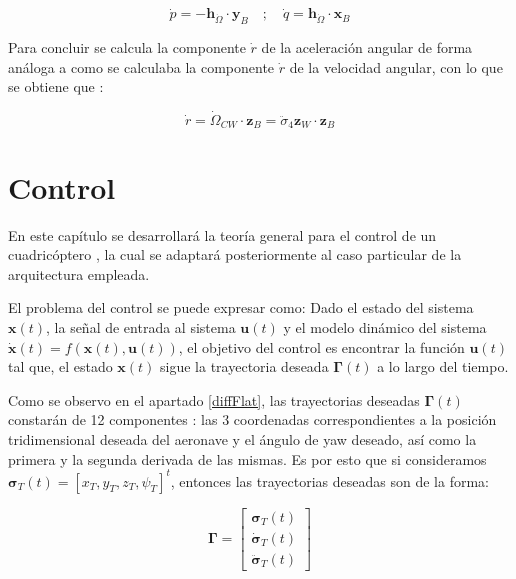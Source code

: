 \begin{equation}
	\dot p = -\textbf{h}_{\dot \Omega} \cdot \mathbf{y}_B \quad;\quad \dot q = \textbf{h}_{\dot \Omega}  \cdot \mathbf{x}_B
\end{equation}

Para concluir se calcula la componente $\dot{r}$ de la aceleración angular de forma análoga a como se calculaba la componente $\dot{r}$ de la velocidad angular, con lo que se obtiene que :

\begin{equation}
	 \dot r = \dot\Omega_{CW} \cdot \mathbf{z}_B =  \ddot \sigma_4 \mathbf{z}_W \cdot \mathbf{z}_B
	\end{equation}


\chapter{Control}
En este capítulo se desarrollará la teoría general para el control de un cuadricóptero \cite{MinimunSnap2011}\cite{mahony2012multirotor}\cite{amir2008modeling}\cite{mellinger2012trajectory}\cite{drones}, la cual se adaptará posteriormente al caso particular de la arquitectura empleada.

El problema del control se puede expresar como: 
Dado el estado del sistema $\mathbf{x}(t)$, la señal de entrada al sistema $\mathbf{u}(t)$ y el modelo dinámico del sistema $ \mathbf{\dot x}(t) = f(\mathbf{x}(t),\mathbf{u}(t))$, el objetivo del control es encontrar la función $\mathbf{u}(t)$ tal que, el estado $\mathbf{x}(t)$ sigue la trayectoria deseada $\mathbf{\Gamma}(t)$ a lo largo del tiempo.

 Como se observo en el apartado \ref{diffFlat}, las trayectorias deseadas $\mathbf{\Gamma}(t)$ constarán de 12 componentes : las 3 coordenadas correspondientes a la posición tridimensional deseada del aeronave y el ángulo de yaw deseado, así como la primera y la segunda derivada de las mismas. Es por esto que si consideramos $\mathbf{\sigma}_{T}(t) = [x_{T},y_{T},z_{T}, \psi_{T}]^t$, entonces las trayectorias deseadas son de la forma:
 
 \begin{equation}
 	\mathbf{\Gamma} = \begin{bmatrix}
 		\mathbf{\sigma}_{T}(t)\\
 		\mathbf{\dot \sigma}_{T}(t)\\
 		\mathbf{\ddot \sigma}_{T}(t)
 	\end{bmatrix}
 \end{equation}



